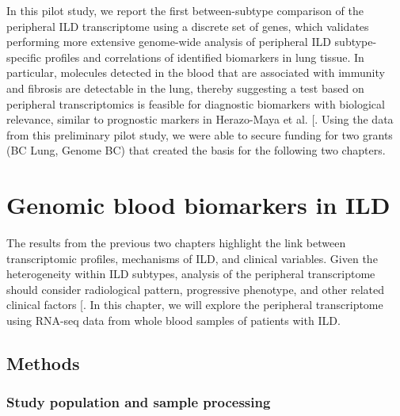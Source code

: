 \documentclass[
]{article}
\begin{document}
In this pilot study, we report the first between-subtype comparison of the peripheral ILD transcriptome using a discrete set of genes, which validates performing more extensive genome-wide analysis of peripheral ILD subtype-specific profiles and correlations of identified biomarkers in lung tissue. In particular, molecules detected in the blood that are associated with immunity and fibrosis are detectable in the lung, thereby suggesting a test based on peripheral transcriptomics is feasible for diagnostic biomarkers with biological relevance, similar to prognostic markers in Herazo-Maya et al. {[}\citeproc{ref-herazo-maya_validating_2017}{100}{]}. Using the data from this preliminary pilot study, we were able to secure funding for two grants (BC Lung, Genome BC) that created the basis for the following two chapters.

\clearpage

\section{Genomic blood biomarkers in ILD}\label{genomic-blood-biomarkers-in-ild}

\renewcommand{\thefigure}{4.\arabic{figure}}
\setcounter{figure}{0}
\renewcommand{\thetable}{4.\arabic{table}}
\setcounter{table}{0}
\renewcommand{\theequation}{4.\arabic{equation}}
\setcounter{equation}{0}

The results from the previous two chapters highlight the link between transcriptomic profiles, mechanisms of ILD, and clinical variables. Given the heterogeneity within ILD subtypes, analysis of the peripheral transcriptome should consider radiological pattern, progressive phenotype, and other related clinical factors {[}\citeproc{ref-ryerson_lumpers_2019}{120}{]}. In this chapter, we will explore the peripheral transcriptome using RNA-seq data from whole blood samples of patients with ILD.

\subsection{Methods}\label{methods-2}

\subsubsection{Study population and sample processing}\label{study-population-and-sample-processing-1}
\end{document}
